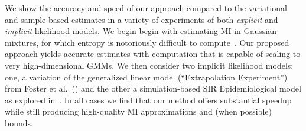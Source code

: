 We show the accuracy and speed of our approach compared to the
variational and sample-based estimates in a variety of experiments of
both \emph{explicit} and \emph{implicit} likelihood models.  We begin
begin with estimating MI in Gaussian mixtures, for which entropy is
notoriously difficult to compute~\cite{huber2008entropy}.  Our
proposed approach yields accurate estimates with computation that is
capable of scaling to very high-dimensional GMMs.  We then consider
two implicit likelihood models: one, a variation of the generalized
linear model (``Extrapolation Experiment'') from Foster et
al.~(\citeyear{Foster2019}) and the other a simulation-based SIR
Epidemiological model as explored in~\cite{kleinegesse2021sequential}.
In all cases we find that our method offers substantial speedup while
still producing high-quality MI approximations and (when possible) bounds.






